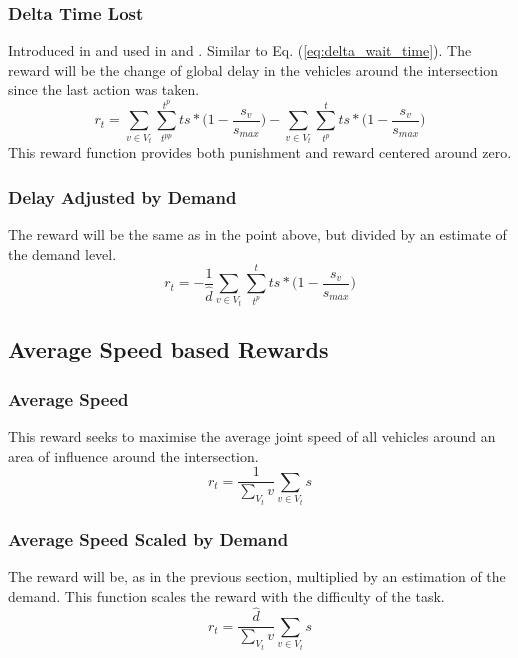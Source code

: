 \documentclass[conference]{IEEEtran}
\begin{document}
\subsubsection{Delta Time Lost}
Introduced in \cite{abdulhai2010} and used in \cite{mannion} \cite{genders2016} \cite{gao2017} \cite{mousavi2017} and \cite{genders2018}.
Similar to Eq. (\ref{eq:delta_wait_time}).
The reward will be the change of global delay in the vehicles around the intersection since the last action was taken.
\begin{equation}
   r_t = \sum_{v \in V_t}  \sum_{t^{pp}}^{t^p} ts * \big( 1-\frac{s_v}{s_{max}} \big) - \sum_{v \in V_t}  \sum_{t^p}^t ts * \big( 1-\frac{s_v}{s_{max}} \big)
\label{eq:changedelay} 
\end{equation}
This reward function provides both punishment and reward centered around zero.

\subsubsection{Delay Adjusted by Demand}
The reward will be the same as in the point above, but divided by an estimate of the demand level.
\begin{equation}
    r_t = -\frac{1}{\hat{d}} \sum_{v\in V_t}  \sum_{t^p}^t ts * \big( 1-\frac{s_v}{s_{max}} \big)
\label{eq:delay_dn}
\end{equation}

\subsection{Average Speed based Rewards}
\subsubsection{Average Speed}
This reward seeks to maximise the average joint speed of all vehicles around an area of influence around the intersection.
\begin{equation}
    r_t = \frac{1}{\sum_{V_t} v} \sum_{v \in V_t} s
\label{eq:avgspeed}
\end{equation}

\subsubsection{Average Speed Scaled by Demand}
The reward will be, as in the previous section, multiplied by an estimation of the demand. This function scales the reward with the difficulty of the task.
\begin{equation}
    r_t = \frac{\hat{d}}{\sum_{V_t} v} \sum_{v \in V_t} s
\label{eq:avgspeed_dn}
\end{equation}
\end{document}
